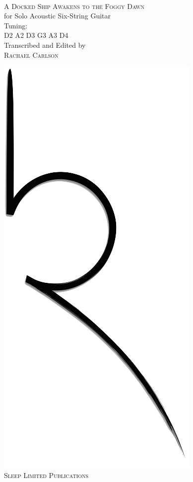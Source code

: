 \begin{titlepage}
    \begin{center}
        \vspace*{1.73cm}
        \textsc{}\\[3cm]
        \textsc{\Huge A Docked Ship Awakens to the Foggy Dawn}\\[.5cm]
        for Solo Acoustic Six-String Guitar\\[.5cm]
        Tuning:\\
        D{\tiny 2} A{\tiny 2} D{\tiny 3} G{\tiny 3} A{\tiny 3} D{\tiny 4}\\[3cm]
        Transcribed and Edited by\\
        \textsc{Rachael Carlson}\\
        \date{}
        \vfill
        \includegraphics[scale=0.075]{logo}\\
        \textsc{Sleep Limited Publications}


    \end{center}

\end{titlepage}
